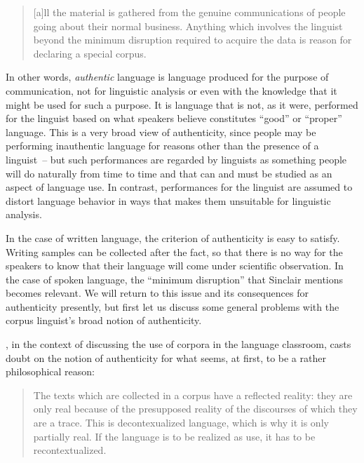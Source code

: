 \begin{quotation}
[a]ll the material is gathered from the genuine communications of people going about their normal business. Anything which involves the linguist beyond the minimum disruption required to acquire the data is reason for declaring a special corpus. \citep{sinclair_eagles_1996}
\end{quotation}

In other words, \emph{authentic}  language is language produced for the purpose of communication, not for linguistic analysis or even with the knowledge that it might be used for such a purpose. It is language that is not, as it were, performed for the linguist based on what speakers believe constitutes ``good'' or ``proper'' language. This is a very broad view of authenticity,  since people may be performing inauthentic language for reasons other than the presence of a linguist~-- but such performances are regarded by linguists as something people will do naturally from time to time and that can and must be studied as an aspect of language use. In contrast, performances for the linguist are assumed to distort language behavior in ways that makes them unsuitable for linguistic analysis.

In the case of written  language, the criterion of authenticity  is easy to satisfy. Writing samples  can be collected after the fact, so that there is no way for the speakers to know that their language will come under scientific observation. In the case of spoken  language, the ``minimum disruption'' that Sinclair mentions becomes relevant. We will return to this issue and its consequences for authenticity  presently, but first let us discuss some general problems with the corpus linguist's broad notion of  authenticity.

\citet{widdowson_limitations_2000}, in the context of discussing the use of corpora in the language classroom, casts doubt on the notion of authenticity  for what seems, at first, to be a rather philosophical reason:

\begin{quotation}
The texts which are collected in a corpus have a reflected reality: they are only real because of the presupposed reality of the discourses of which they are a trace. This is decontexualized language, which is why it is only partially real. If the language is to be realized as use, it has to be recontextualized. \citep[7]{widdowson_limitations_2000}
\end{quotation}

